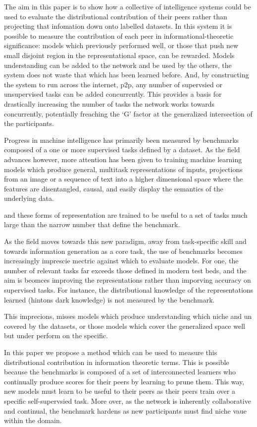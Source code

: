 \documentclass{article}
\begin{document}
The aim in this paper is to show how a collective of intelligence systems could be used to evaluate the distributional contribution of their peers rather than projecting that infomation down onto labelled datasets. In this system it is possible to measure the contribution of each peer in informational-theoretic significance: models which previously performed well, or those that push new small disjoint region in the representational space, can be rewarded.  Models understanding can be added to the network and be used by the others, the system does not waste that which has been learned before. And, by constructing the system to run across the internet, p2p, any number of supervsied or unsupervised tasks can be added concurrently. This provides a basis for drastically increasing the number of tasks the network works towards concurrently, potentially freaching the ‘G’ factor at the generalized intersection of the participants. 


Progress in machine intelligence has primarily been measured by benchmarks composed of a one or more supervised tasks defined by a dataset. As the field advances however, more attention has been given to training machine learning models which produce general, multitask representations of inputs, projections from an image or a sequence of text into a higher dimensional space where the features are disentangled, causal, and easily display the semantics of the underlying data. 

and these forms of representation are trained to be useful to a set of tasks much large than the narrow number that define the benchmark. 

As the field moves towards this new paradigm, away from task-specific skill and towards information generation as a core task, the use of benchmarks becomes increasingly imprescie mectric against which to evaluate models. For one, the number of relevant tasks far exceeds those defined in modern test beds, and the aim is beomces improving the representations rather than imporving accuracy on supervised tasks. For instance, the distributional knowledge of the representations learned (hintons dark knowledge) is not measured by the benchmark. 

This imprecions, misses models which produce understanding which niche and un covered by the datasets, or those models which cover the generalized space well but under perform on the specific. 

In this paper we propose a method which can be used to measure this distributional contribution in information theoretic terms. This is possible because the benchmarks is composed of a set of interconnected learners who continually produce scores for their peers by learning to prune them. This way, new models must learn to be useful to their peers as their peers train over a specific self-supervsied task. More over, as the network is inherently collaborative and continual, the benchmark hardens as new participants must find niche vaue within the domain. 
\end{document}
